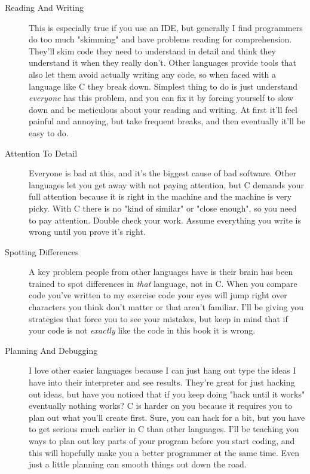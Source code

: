 \begin{description}

\item[Reading And Writing] This is especially true if you use an IDE, but
    generally I find programmers do too much "skimming" and have problems
    reading for comprehension.  They'll skim code they need to understand
    in detail and think they understand it when they really don't.  Other languages
    provide tools that also let them avoid actually writing any code, so
    when faced with a language like C they break down.  Simplest thing to
    do is just understand \emph{everyone} has this problem, and you can fix
    it by forcing yourself to slow down and be meticulous about your reading
    and writing.  At first it'll feel painful and annoying, but take frequent
    breaks, and then eventually it'll be easy to do.

\item[Attention To Detail] Everyone is bad at this, and it's the biggest cause
    of bad software.  Other languages let you get away with not paying attention,
    but C demands your full attention because it is right in the machine and the
    machine is very picky.  With C there is no "kind of similar" or "close enough",
    so you need to pay attention.  Double check your work.  Assume everything you
    write is wrong until you prove it's right.

\item[Spotting Differences] A key problem people from other languages have is 
    their brain has been trained to spot differences in \emph{that} language,
    not in C.  When you compare code you've written to my exercise code your
    eyes will jump right over characters you think don't matter or that aren't
    familiar.  I'll be giving you strategies that force you to see your 
    mistakes, but keep in mind that if your code is not \emph{exactly} like
    the code in this book it is wrong.

\item[Planning And Debugging]  I love other easier languages because I can
    just hang out type the ideas I have into their interpreter and see results.
    They're great for just hacking out ideas, but have you noticed that if you
    keep doing "hack until it works" eventually nothing works?  C is harder on
    you because it requires you to plan out what you'll create first.  Sure,
    you can hack for a bit, but you have to get serious much earlier in C than
    other languages.  I'll be teaching you ways to plan out key parts of your
    program before you start coding, and this will hopefully make you a
    better programmer at the same time.  Even just a little planning can smooth
    things out down the road.
\end{description}


